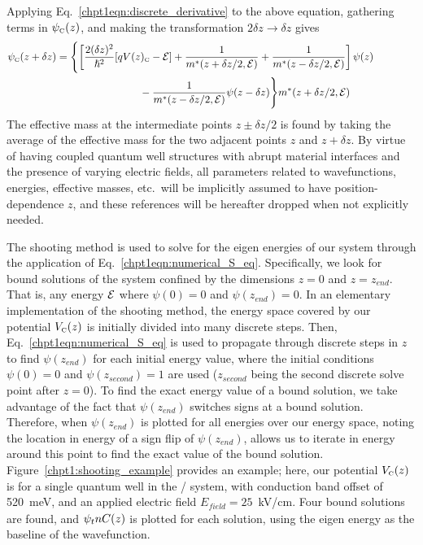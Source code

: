 Applying Eq.~\eqref{chpt1eqn:discrete_derivative} to the above equation, gathering terms in $\psi_{\textnormal{\tiny{C}}}(z)$, and making the transformation $2 \delta z \rightarrow \delta z$ gives
\begin{equation}
\label{chpt1eqn:numerical_S_eq}
\begin{split}
\psi_\tn{\tiny{C}}(z+\delta z) &= \Biggl\{ \left[ \frac{2(\delta z)^2}{\hslash^2} [q V(z)_\tn{\tiny{C}}-\EE]+\frac{1}{m^{*}(z+\delta z/2,\EE)}+\frac{1}{m^{*}(z-\delta z/2,\EE)} \right] \psi(z) \qquad \qquad\\
& \qquad \qquad \qquad \qquad  - \frac{1}{m^{*}(z-\delta z/2,\EE)} \psi(z-\delta z) \Biggr\} m^{*}(z+\delta z/2,\EE)
\end{split}
\end{equation}
The effective mass at the intermediate points $z\pm \delta z/2$ is found by taking the average of the effective mass for the two adjacent points $z$ and $z+\delta z$.  By virtue of having coupled quantum well structures with abrupt material interfaces and the presence of varying electric fields, all parameters related to wavefunctions, energies, effective masses, etc.\ will be implicitly assumed to have position-dependence $z$, and these references will be hereafter dropped when not explicitly needed.

The shooting method is used to solve for the eigen energies of our system through the application of Eq.~\eqref{chpt1eqn:numerical_S_eq}.  Specifically, we look for bound solutions of the system confined by the dimensions $z=0$ and $z=z_{end}$.  That is, any energy $\EE$ where $\psi(0)=0$ and $\psi(z_{end})=0$.  In an elementary implementation of the shooting method, the energy space covered by our potential $V_{\textnormal{\tiny{C}}}(z)$ is initially divided into many discrete steps.  Then, Eq.~\eqref{chpt1eqn:numerical_S_eq} is used to propagate through discrete steps in $z$ to find $\psi(z_{end})$ for each initial energy value, where the initial conditions $\psi(0)=0$ and $\psi(z_\textit{second})=1$  are used ($z_\textit{second}$ being the second discrete solve point after $z=0$).  To find the exact energy value of a bound solution, we take advantage of the fact that $\psi(z_{end})$ switches signs at a bound solution.  Therefore, when $\psi(z_{end})$ is plotted for all energies over our energy space, noting the location in energy of a sign flip of $\psi(z_{end})$, allows us to iterate in energy around this point to find the exact value of the bound solution.  Figure~\ref{chpt1:shooting_example} provides an example; here, our potential $V_{\textnormal{\tiny{C}}}(z)$ is for a single quantum well in the \InGaAs / \AlInAs system, with conduction band offset of 520~meV, and an applied electric field $E_\textit{field}=25$~kV/cm.  Four bound solutions are found, and $\psi_tn{\tiny{C}}(z)$ is plotted for each solution, using the eigen energy as the baseline of the wavefunction.

